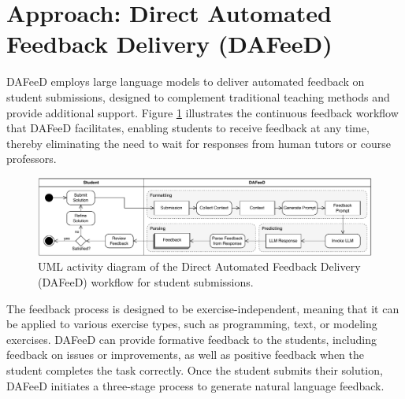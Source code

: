 \documentclass[manuscript,screen,review]{acmart}
\begin{document}





\section{Approach: Direct Automated Feedback Delivery (DAFeeD)} %
\label{sec:approach:DAFeeD}

DAFeeD employs large language models to deliver automated feedback on student submissions, designed to complement traditional teaching methods and provide additional support.
Figure \ref{fig:DAFeeD-workflow} illustrates the continuous feedback workflow that DAFeeD facilitates, enabling students to receive feedback at any time, thereby eliminating the need to wait for responses from human tutors or course professors.

\begin{figure}[htbp]
  \centering
  \includegraphics[width=\linewidth]{figures/DAFeeD-ActivityDiagram_alternative.pdf}
  \caption{UML activity diagram of the Direct Automated Feedback Delivery (DAFeeD) workflow for student submissions.}
  \label{fig:DAFeeD-workflow}
\end{figure}

The feedback process is designed to be exercise-independent, meaning that it can be applied to various exercise types, such as programming, text, or modeling exercises.
DAFeeD can provide formative feedback to the students, including feedback on issues or improvements, as well as positive feedback when the student completes the task correctly.
Once the student submits their solution, DAFeeD initiates a three-stage process to generate natural language feedback.
\end{document}
